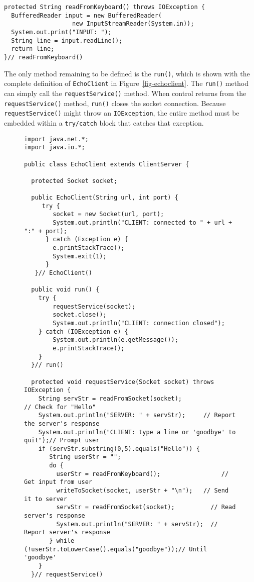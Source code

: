 {\begin{jjjlisting}
\begin{lstlisting}
protected String readFromKeyboard() throws IOException {
  BufferedReader input = new BufferedReader(
                   new InputStreamReader(System.in));
  System.out.print("INPUT: ");
  String line = input.readLine();
  return line;
}// readFromKeyboard()
\end{lstlisting}
\end{jjjlisting}

The only method remaining to be defined is the {\tt run()}, which is
shown with the complete definition of {\tt EchoClient} in
Figure~\ref{fig-echoclient}.  The {\tt run()} method can simply call
the {\tt requestService()} method.  When control returns from the
{\tt requestService()} method, {\tt run()} closes the socket connection.
Because {\tt requestService()} might throw an {\tt IOException}, the entire
method must be embedded within a {\tt try/catch} block that catches
that exception.

\begin{figure}[p]
\jjjprogstart
\begin{jjjlisting}[37pc]
\begin{lstlisting}
import java.net.*;
import java.io.*;

public class EchoClient extends ClientServer {

  protected Socket socket;

  public EchoClient(String url, int port) {
     try {
        socket = new Socket(url, port);
        System.out.println("CLIENT: connected to " + url + ":" + port);
      } catch (Exception e) {
        e.printStackTrace();
        System.exit(1);
      }
   }// EchoClient()

  public void run() {
    try {
        requestService(socket);
        socket.close();
        System.out.println("CLIENT: connection closed");
    } catch (IOException e) {
        System.out.println(e.getMessage());
        e.printStackTrace();
    }
  }// run()

  protected void requestService(Socket socket) throws IOException {
    String servStr = readFromSocket(socket);                 // Check for "Hello"
    System.out.println("SERVER: " + servStr);     // Report the server's response
    System.out.println("CLIENT: type a line or 'goodbye' to quit");// Prompt user
    if (servStr.substring(0,5).equals("Hello")) {
       String userStr = "";
       do {
         userStr = readFromKeyboard();                 // Get input from user
         writeToSocket(socket, userStr + "\n");   // Send it to server
         servStr = readFromSocket(socket);          // Read server's response
         System.out.println("SERVER: " + servStr);  // Report server's response
       } while (!userStr.toLowerCase().equals("goodbye"));// Until 'goodbye'
    }
  }// requestService()


\end{lstlisting}
\end{jjjlisting}
\end{figure}}
